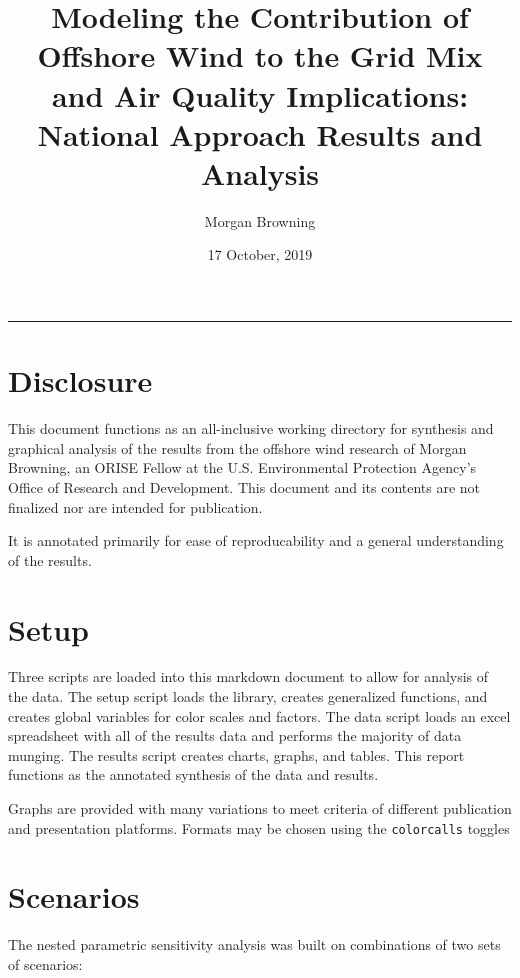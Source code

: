 \documentclass[]{article}
\title{Modeling the Contribution of Offshore Wind to the Grid Mix and Air
Quality Implications: National Approach Results and Analysis}
\author{Morgan Browning}
\date{17 October, 2019}
\begin{document}
\maketitle

{
\setcounter{tocdepth}{2}
\tableofcontents
}
\begin{center}\rule{0.5\linewidth}{\linethickness}\end{center}

\hypertarget{disclosure}{%
\section{Disclosure}\label{disclosure}}

This document functions as an all-inclusive working directory for
synthesis and graphical analysis of the results from the offshore wind
research of Morgan Browning, an ORISE Fellow at the U.S. Environmental
Protection Agency's Office of Research and Development. This document
and its contents are not finalized nor are intended for publication.

It is annotated primarily for ease of reproducability and a general
understanding of the results.

\hypertarget{setup}{%
\section{Setup}\label{setup}}

Three scripts are loaded into this markdown document to allow for
analysis of the data. The setup script loads the library, creates
generalized functions, and creates global variables for color scales and
factors. The data script loads an excel spreadsheet with all of the
results data and performs the majority of data munging. The results
script creates charts, graphs, and tables. This report functions as the
annotated synthesis of the data and results.

Graphs are provided with many variations to meet criteria of different
publication and presentation platforms. Formats may be chosen using the
\texttt{colorcalls} toggles

\hypertarget{scenarios}{%
\section{Scenarios}\label{scenarios}}

The nested parametric sensitivity analysis was built on combinations of
two sets of scenarios:
\end{document}
